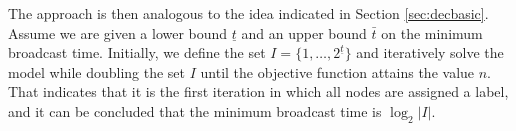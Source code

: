 The approach is then analogous to the idea indicated in Section \ref{sec:decbasic}.
Assume we are given a lower bound $\underline{t}$ and an upper bound $\bar{t}$ on the minimum broadcast time.
Initially, we define the set $I=\{1,\dots,2^{\underline{t}}\}$ and iteratively solve the model while doubling the set $I$ until the objective function attains the value $n$.
That indicates that it is the first iteration in which all nodes are assigned a label, and it can be concluded that the minimum broadcast time is $\log_2|I|$.

